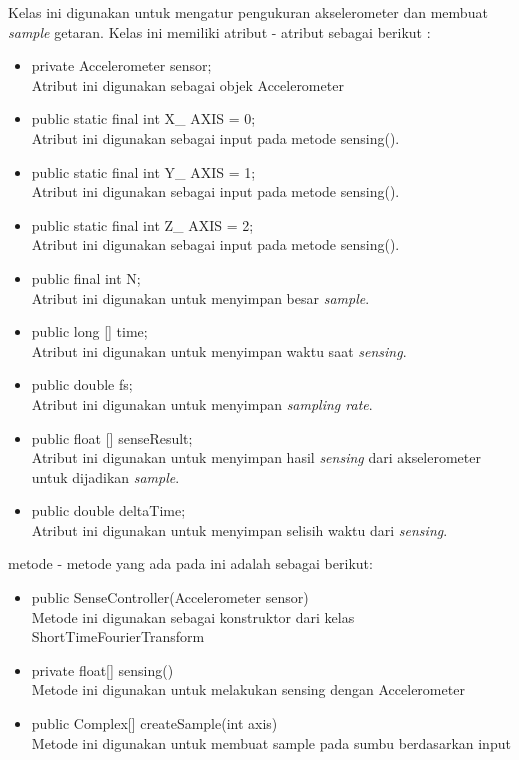 Kelas ini digunakan untuk mengatur pengukuran akselerometer dan membuat {\it sample} getaran. Kelas ini memiliki atribut - atribut sebagai berikut :
\begin{itemize}
	\item private Accelerometer sensor; \\
		Atribut ini digunakan sebagai objek Accelerometer
	\item public static final int X\_ AXIS = 0; \\
		Atribut ini digunakan sebagai input pada metode sensing().
	\item public static final int Y\_ AXIS = 1; \\
		Atribut ini digunakan sebagai input pada metode sensing().
	\item public static final int Z\_ AXIS = 2; \\
		Atribut ini digunakan sebagai input pada metode sensing().
	\item public final int N;  \\
		Atribut ini digunakan untuk menyimpan besar {\it sample}.
	\item public long [] time; \\
		Atribut ini digunakan untuk menyimpan waktu saat {\it sensing}.
	\item public double fs; \\
		Atribut ini digunakan untuk menyimpan {\it sampling rate}.
	\item public float [] senseResult; \\
		Atribut ini digunakan untuk menyimpan hasil {\it sensing} dari akselerometer untuk dijadikan {\it sample}.
	\item public double deltaTime;\\
		Atribut ini digunakan untuk menyimpan selisih waktu dari {\it sensing}.
\end{itemize}
metode - metode yang ada pada ini adalah sebagai berikut:
\begin{itemize}
	\item public SenseController(Accelerometer sensor) \\
		Metode ini digunakan sebagai konstruktor dari kelas ShortTimeFourierTransform
	\item private float[] sensing() \\
		Metode ini digunakan untuk melakukan sensing dengan Accelerometer
	\item public Complex[] createSample(int axis) \\
		Metode ini digunakan untuk membuat sample pada sumbu berdasarkan input 
\end{itemize}

